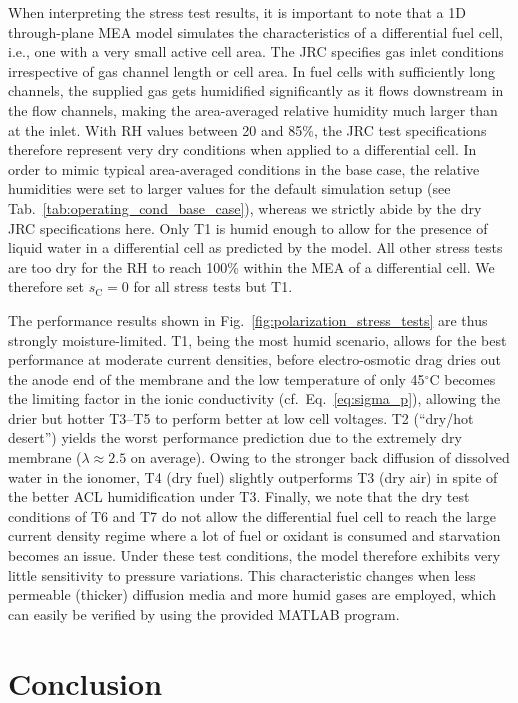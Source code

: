 \documentclass[fontsize=9pt,DIV=calc,a4paper,twocolumn]{scrartcl}
\begin{document}
When interpreting the stress test results, it is important to note that a 1D through-plane MEA model simulates the characteristics of a differential fuel cell, i.e., one with a very small active cell area. The JRC specifies gas inlet conditions irrespective of gas channel length or cell area. In fuel cells with sufficiently long channels, the supplied gas gets humidified significantly as it flows downstream in the flow channels, making the area-averaged relative humidity much larger than at the inlet. With RH values between 20 and 85\%, the JRC test specifications therefore represent very dry conditions when applied to a differential cell. In order to mimic typical area-averaged conditions in the base case, the relative humidities were set to larger values for the default simulation setup (see Tab.~\ref{tab:operating_cond_base_case}), whereas we strictly abide by the dry JRC specifications here. Only T1 is humid enough to allow for the presence of liquid water in a differential cell as predicted by the model. All other stress tests are too dry for the RH to reach 100\% within the MEA of a differential cell. We therefore set $s_\mathrm{C}=0$ for all stress tests but T1.

The performance results shown in Fig.~\ref{fig:polarization_stress_tests} are thus strongly moisture-limited. T1, being the most humid scenario, allows for the best performance at moderate current densities, before electro-osmotic drag dries out the anode end of the membrane and the low temperature of only 45$^\circ$C becomes the limiting factor in the ionic conductivity (cf.\ Eq.~\ref{eq:sigma_p}), allowing the drier but hotter T3--T5 to perform better at low cell voltages. T2 (``dry/hot desert'') yields the worst performance prediction due to the extremely dry membrane ($\lambda\approx2.5$ on average). Owing to the stronger back diffusion of dissolved water in the ionomer, T4 (dry fuel) slightly outperforms T3 (dry air) in spite of the better ACL humidification under T3. Finally, we note that the dry test conditions of T6 and T7 do not allow the differential fuel cell to reach the large current density regime where a lot of fuel or oxidant is consumed and starvation becomes an issue. Under these test conditions, the model therefore exhibits very little sensitivity to pressure variations. This characteristic changes when less permeable (thicker) diffusion media and more humid gases are employed, which can easily be verified by using the provided MATLAB program.

\section{Conclusion}
\end{document}
